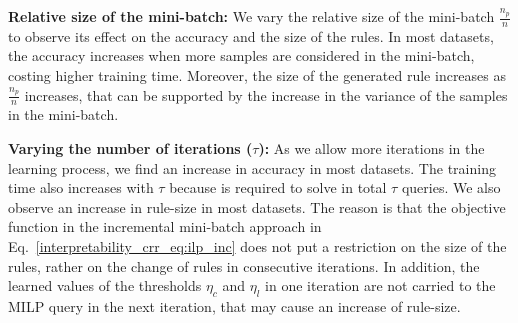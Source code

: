 	 
	 
	\textbf{Relative size of the mini-batch:} We vary the relative size of the mini-batch $ \frac{n_p}{n} $ to observe its effect on the accuracy and the size of the rules. In most datasets,  the accuracy increases when more samples are considered in the mini-batch, costing higher   training time.  Moreover, the size of the generated rule increases as $ \frac{n_p}{n} $ increases, that can be supported by the increase  in the variance of the samples in the mini-batch.
	
	\textbf{Varying the number of iterations ($ \tau $):}   
	As we allow more iterations in the learning process, we find an increase in accuracy in most datasets. The training time also increases with $ \tau $ because {\crr} is required to solve in total $ \tau $ queries. We also observe an increase in rule-size in most datasets. The reason is that the objective function in the incremental mini-batch approach in Eq.~\ref{interpretability_crr_eq:ilp_inc} does not put a restriction on the size of the rules, rather on the change of rules in consecutive iterations.  In addition, the learned values of the thresholds $ \eta_c$ and $ \eta_l $  in one iteration are not carried to the MILP query in the next iteration, that may cause an increase of rule-size. 
	

	



	
	
